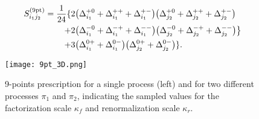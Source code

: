 \begin{equation}\label{9M}
\begin{split}
    S^{(\rm 9pt)}_{i_1j_2} =
    \frac{1}{24}\{&2\big(\Delta_{i_1}^{+0}+\Delta_{i_1}^{++}
    + \Delta_{i_1}^{+-}\big) \big(\Delta_{j_2}^{+0} +
    \Delta_{j_2}^{++} + \Delta_{j_2}^{+-} \big) \\ 
            + &2\big(\Delta_{i_1}^{-0} + \Delta_{i_1}^{-+} +
            \Delta_{i_1}^{--}\big)\big(\Delta_{j_2}^{-0} +
            \Delta_{j_2}^{-+} + \Delta_{j_2}^{--} \big) \big\}\\ 
            + &3\big(\Delta_{i_1}^{0+}+ \Delta_{i_1}^{0-}\big)\big(\Delta_{j_2}^{0+} + \Delta_{j_2}^{0-} \big)\}.
\end{split}            
\end{equation}

\begin{figure}[t]
    \centering
    {}
    \texttt{[image: 9pt\_3D.png]}
    \begin{caption}{9-points prescription for a single process (left) and for two different processes $\pi_1$
        and $\pi_2$, indicating
        the sampled values for the factorization scale $\kappa_f$ and 
        renormalization scale $\kappa_r$.
    \label{fig:symmetricPrescriptions}
      }
    \end{caption}
    \end{figure}

